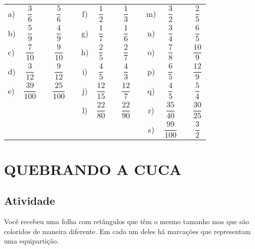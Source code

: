 \documentclass[a4,12pt]{book}
\begin{document}
\begin{center}
\begin{tabular}{lccccccccccccc}
 a)  &  $\dfrac{3}{6}$     &   &  $\dfrac{5}{6}$   & \parbox[t][.6cm]{2cm}{ } \quad \quad\quad  & f)  &  $\dfrac{1}{2}$     &   &  $\dfrac{1}{3}$    & \quad \quad\quad  & m)  &  $\dfrac{3}{2}$     &   &  $\dfrac{2}{5}$    \\
 b)  &  $\dfrac{5}{9}$     &   &  $\dfrac{4}{9}$   & \parbox[t][.6cm]{2cm}{ }    & g)  &  $\dfrac{1}{7}$     &   &  $\dfrac{1}{6}$    &   & n)  &  $\dfrac{3}{4}$     &   &  $\dfrac{6}{5}$    \\
 c)  &  $\dfrac{7}{10}$    &   &  $\dfrac{9}{10}$   & \parbox[t][.6cm]{2cm}{ }   & h)  &  $\dfrac{2}{5}$     &   &  $\dfrac{2}{7}$    &   & o)  &  $\dfrac{7}{8}$     &   &  $\dfrac{10}{9}$   \\
 d)  &  $\dfrac{3}{12}$    &   &  $\dfrac{9}{12}$   & \parbox[t][.6cm]{2cm}{ }   & i)  &  $\dfrac{4}{5}$     &   &  $\dfrac{4}{3}$    &   & p)  &  $\dfrac{6}{5}$     &   &  $\dfrac{12}{9}$   \\
 e)  &  $\dfrac{39}{100}$  &   &  $\dfrac{25}{100}$ & \parbox[t][.6cm]{2cm}{ }   & j)  &  $\dfrac{12}{15}$   &   &  $\dfrac{12}{7}$   &   & q)  &  $\dfrac{4}{5}$     &   &  $\dfrac{5}{4}$    \\
     &&                     &    &                  \parbox[t][.6cm]{2cm}{ }    &  l)  &  $\dfrac{22}{80}$   &   &  $\dfrac{22}{90}$  &   & r)  &  $\dfrac{35}{40}$   &   &  $\dfrac{30}{25}$  \\
     &&                      &    &                    &      &  \parbox[t][.6cm]{2cm}{ }                    &   &                   &   &  s)  &  $\dfrac{99}{100}$  &   &  $\dfrac{3}{2}$    \\
\end{tabular} 
 \end{center}
 
\section{QUEBRANDO A CUCA }


\subsection{Atividade}

Você recebeu uma folha com retângulos que têm o mesmo tamanho mas que são coloridos de maneira diferente. Em cada um deles há marcações que representam uma equipartição.  
\end{document}
